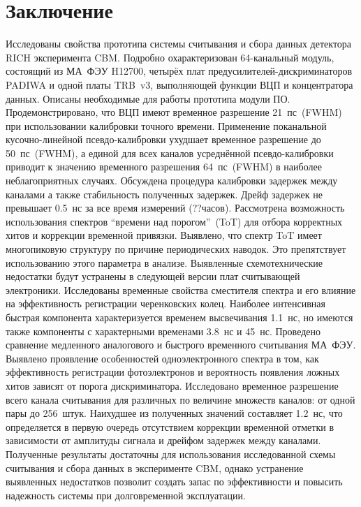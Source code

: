 \section*{Заключение}\label{sec:secSummary}

Исследованы свойства прототипа системы считывания и сбора данных детектора RICH эксперимента CBM. Подробно охарактеризован 64-канальный модуль, состоящий из МА~ФЭУ H12700, четырёх плат предусилителей-дискриминаторов PADIWA и одной платы TRB~v3, выполняющей функции ВЦП и концентратора данных. Описаны необходимые для работы прототипа модули ПО. Продемонстрировано, что ВЦП имеют временное разрешение 21~пс~(FWHM) при использовании калибровки точного времени. Применение поканальной кусочно-линейной псевдо-калибровки ухудшает временное разрешение до 50~пс~(FWHM), а единой для всех каналов усреднённой псевдо-калибровки приводит к значению временного разрешения 64~пс~(FWHM) в наиболее неблагоприятных случаях. Обсуждена процедура калибровки задержек между каналами а также стабильность полученных задержек. Дрейф задержек не превышает 0.5~нс за все время измерений (??часов).
Рассмотрена возможность использования спектров ``времени над порогом''~(ToT) для отбора корректных хитов и коррекции временной привязки. Выявлено, что спектр ToT имеет многопиковую структуру по причине периодических наводок. Это препятствует использованию этого параметра в анализе. Выявленные схемотехнические недостатки будут устранены в следующей версии плат считывающей электроники. Исследованы временные свойства сместителя спектра и его влияние на эффективность регистрации черенковских колец. Наиболее интенсивная быстрая компонента характеризуется временем высвечивания 1.1~нс, но имеются также компоненты с характерными временами 3.8~нс и 45~нс. Проведено сравнение медленного аналогового и быстрого временного считывания МА~ФЭУ. Выявлено проявление особенностей одноэлектронного спектра в том, как эффективность регистрации фотоэлектронов и вероятность появления ложных хитов зависят от порога дискриминатора. Исследовано временное разрешение всего канала считывания для различных по величине множеств каналов: от одной пары до 256~штук. Наихудшее из полученных значений составляет 1.2~нс, что определяется в первую очередь отсутствием коррекции временной отметки в зависимости от амплитуды сигнала и дрейфом задержек между каналами. Полученные результаты достаточны для использования исследованной схемы считывания и сбора данных в эксперименте CBM, однако устранение выявленных недостатков позволит создать запас по эффективности и повысить надежность системы при долговременной эксплуатации.
